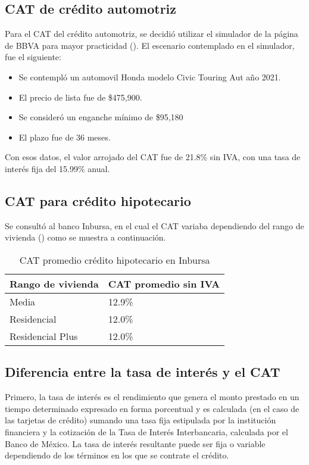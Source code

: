 \documentclass[12pt]{article}
\begin{document}
        \subsection{CAT de crédito automotriz}
            Para el CAT del crédito automotriz, se decidió utilizar el simulador de la página de BBVA para mayor practicidad (\cite{simulador-bbva}). El escenario contemplado en el simulador, fue el siguiente:
            \begin{itemize}
                \item Se contempló un automovil Honda modelo Civic Touring Aut año 2021.
                \item El precio de lista fue de \$475,900.
                \item Se consideró un enganche mínimo de \$95,180
                \item El plazo fue de 36 meses.
            \end{itemize}
            Con esos datos, el valor arrojado del CAT fue de 21.8\% sin IVA, con una tasa de interés fija del 15.99\% anual.
        \subsection{CAT para crédito hipotecario}
            Se consultó al banco Inbursa, en el cual el CAT variaba dependiendo del rango de vivienda (\cite{inbursa-hipoteca}) como se muestra a continuación.
            \begin{table}[h!]
                    \centering
                    \caption {CAT promedio crédito hipotecario en Inbursa} 
                    \begin{tabular}{ll}
                        \hline
                        Rango de vivienda & CAT promedio sin IVA \\
                        \hline
                        Media  & 12.9\%
                        \\       
                        Residencial  & 12.0\%
                        \\         
                        Residencial Plus  & 12.0\%
                    \end{tabular}
                \end{table}
        \subsection{Diferencia entre la tasa de interés y el CAT}
            Primero, la tasa de interés es el rendimiento que genera el monto prestado en un tiempo determinado expresado en forma porcentual y es calculada (en el caso de las tarjetas de crédito) sumando una tasa fija estipulada por la institución financiera y la cotización de la Tasa de Interés Interbancaria, calculada por el Banco de México. La tasa de interés resultante puede ser fija o variable dependiendo de los términos en los que se contrate el crédito.
            
\end{document}
